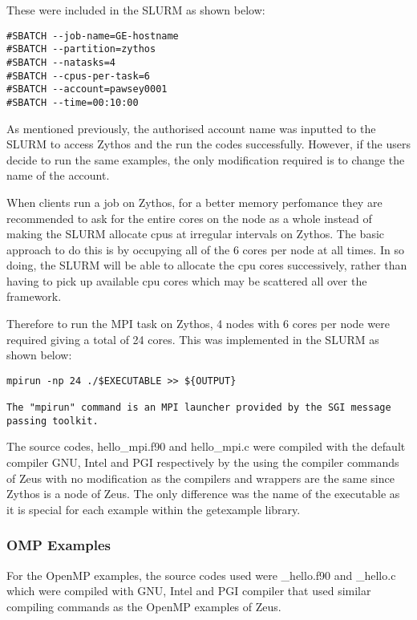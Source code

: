\documentclass[journal]{IEEEtran}
\begin{document}
{These were included in the SLURM as shown below:

\begin{verbatim}
#SBATCH --job-name=GE-hostname
#SBATCH --partition=zythos
#SBATCH --natasks=4
#SBATCH --cpus-per-task=6
#SBATCH --account=pawsey0001
#SBATCH --time=00:10:00
\end{verbatim}

As mentioned previously, the authorised account name was inputted to the SLURM to access Zythos and the run the codes successfully. However, if the
users decide to run the same examples, the only modification required is to change the name of the account.

When clients run a job on Zythos, for a better memory perfomance they  are recommended to ask for the entire cores on the node as a whole instead of making the SLURM
allocate cpus at irregular intervals on Zythos. The basic approach to do this is by occupying all of the 6 cores per node at all times. In so doing, 
the SLURM will be able to allocate the cpu cores successively, rather than having to pick up available cpu cores which may be scattered all over the 
framework.

Therefore to run the MPI task on Zythos, 4 nodes with 6 cores per node were required giving a total of 24 cores. This was implemented in the SLURM as 
shown below:

\begin{verbatim}
mpirun -np 24 ./$EXECUTABLE >> ${OUTPUT}

The "mpirun" command is an MPI launcher provided by the SGI message passing toolkit.
\end{verbatim}

The source codes, hello_mpi.f90 and hello_mpi.c were compiled with the default compiler GNU, Intel and PGI respectively by the using the compiler
commands of Zeus with no modification as the compilers and wrappers are the same since Zythos is a node of Zeus. The only difference was the name of the
executable as it is special for each example within the getexample library.

\subsubsection{OMP Examples}

For the OpenMP examples, the source codes used were \omp\_hello.f90 and \omp\_hello.c which were compiled with GNU, Intel and PGI compiler that used similar
compiling commands as the OpenMP examples of Zeus.

}
\end{document}

